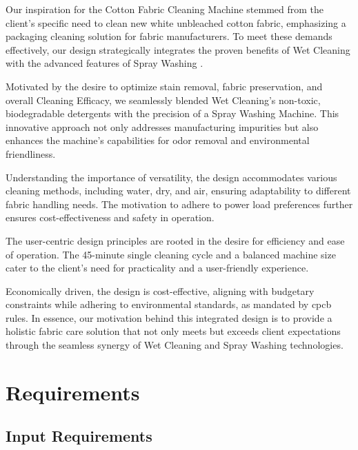 \documentclass[12pt]{article} %
\begin{document}
Our inspiration for the Cotton Fabric Cleaning Machine stemmed from the client's specific need to clean new white unbleached cotton fabric, emphasizing a packaging cleaning solution for fabric manufacturers. To meet these demands effectively, our design strategically integrates the proven benefits of Wet Cleaning with the advanced features of Spray Washing \cite{liu2019research}.
\vspace{10pt}

Motivated by the desire to optimize stain removal, fabric preservation, and overall \gls{Cleaning Efficacy}, we seamlessly blended Wet Cleaning's non-toxic, biodegradable detergents with the precision of a Spray Washing Machine. This innovative approach not only addresses manufacturing impurities but also enhances the machine's capabilities for odor removal and environmental friendliness.
\vspace{10pt}


Understanding the importance of versatility, the design accommodates various cleaning methods, including water, dry, and air, ensuring adaptability to different fabric handling needs. The motivation to adhere to power load preferences further ensures cost-effectiveness and safety in operation.
\vspace{10pt}


The user-centric design principles are rooted in the desire for efficiency and ease of operation. The 45-minute single cleaning cycle and a balanced machine size cater to the client's need for practicality and a user-friendly experience.
\vspace{10pt}


Economically driven, the design is cost-effective, aligning with budgetary constraints while adhering to environmental standards, as mandated by \acrshort{cpcb} rules. In essence, our motivation behind this integrated design is to provide a holistic fabric care solution that not only meets but exceeds client expectations through the seamless synergy of Wet Cleaning and Spray Washing technologies.




\clearpage

\section{Requirements}
\subsection{Input Requirements}
\end{document}
